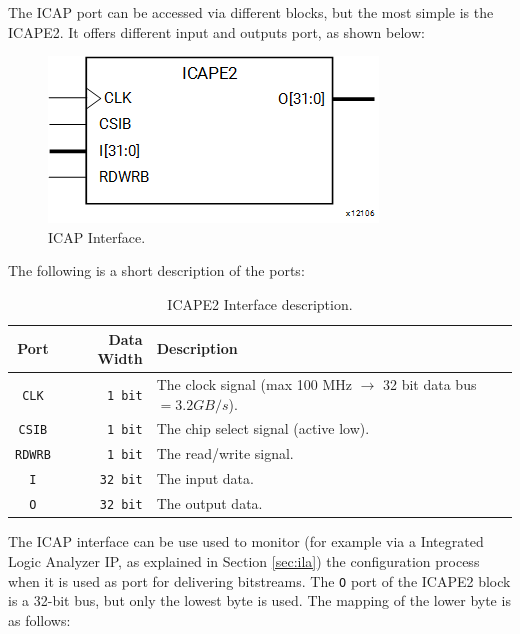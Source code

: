 The ICAP port can be accessed via different blocks, but the most simple is the ICAPE2. It offers different input and outputs port, as shown below:

\begin{figure}[H]
\centering
\includegraphics[width=0.4\linewidth]{images/chapter4/icap.png}
\caption{ICAP Interface.}
\end{figure}

The following is a short description of the ports:

\begin{table}[H]
\centering
\begin{tabular}{ c|r|p{8 cm} }
    \textbf{Port}&\textbf{Data Width}&\textbf{Description}\\
    \hline
    \texttt{CLK}&\texttt{1 bit}&The clock signal (max 100 MHz $\rightarrow$ 32 bit data bus $= 3.2 GB/s$).\\
    \texttt{CSIB}&\texttt{1 bit}&The chip select signal (active low).\\
    \texttt{RDWRB}&\texttt{1 bit}&The read/write signal.\\
    \texttt{I}&\texttt{32 bit}&The input data.\\
    \texttt{O}&\texttt{32 bit}&The output data.\\
\end{tabular}
\caption{ICAPE2 Interface description.}
\end{table}




The ICAP interface can be use used to monitor (for example via a Integrated Logic Analyzer IP, as explained in Section \ref{sec:ila}) the configuration process when it is used as port for delivering bitstreams. The \texttt{O} port of the ICAPE2 block is a 32-bit bus, but only the lowest byte is used. The mapping of the lower byte is as follows:

